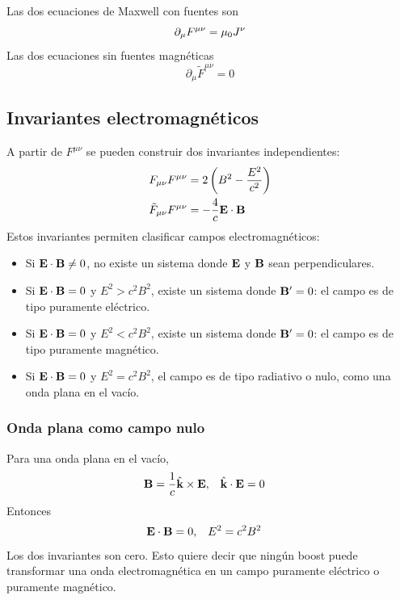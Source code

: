 \documentclass[]{article}
\numberwithin{equation}{section}
\begin{document}
Las dos ecuaciones de Maxwell con fuentes son
\begin{equation}
	\partial_\mu F^{\mu\nu} = \mu_{0} J^\nu
\end{equation}
Las dos ecuaciones sin fuentes magnéticas 
\begin{equation}
	\partial_\mu \tilde{F}^{\mu\nu} = 0
\end{equation}

\subsection{Invariantes electromagnéticos}
A partir de $F^{\mu\nu}$ se pueden construir dos invariantes independientes:
\begin{align}
	F_{\mu\nu} F^{\mu\nu} &= 2 \left(B^2 - \frac{E^2}{c^2}\right)\\
	\tilde{F}_{\mu\nu} F^{\mu\nu} &= -\frac{4}{c} \mathbf{E}\cdot\mathbf{B}
\end{align}
Estos invariantes permiten clasificar campos electromagnéticos:
\begin{itemize}
	\item Si $\mathbf{E} \cdot \mathbf{B} \neq 0$, no existe un sistema donde $\mathbf{E}$ y $\mathbf{B}$ sean perpendiculares.
	\item Si $\mathbf{E} \cdot \mathbf{B} = 0$ y $E^2 > c^2 B^2$, existe un sistema donde $\mathbf{B}' = 0$: el campo es de tipo puramente eléctrico.
	\item Si $\mathbf{E} \cdot \mathbf{B} = 0$ y $E^2 < c^2 B^2$, existe un sistema donde $\mathbf{B}' = 0$: el campo es de tipo puramente magnético.
	\item Si $\mathbf{E} \cdot \mathbf{B} = 0$ y $E^2 = c^2 B^2$, el campo es de tipo radiativo o nulo, como una onda plana en el vacío.
\end{itemize}

\subsubsection{Onda plana como campo nulo}
Para una onda plana en el vacío,
\begin{align*}
	\mathbf{B} &= \frac{1}{c} \hat{\mathbf{k}}\times\mathbf{E}, & \hat{\mathbf{k}}\cdot\mathbf{E} &= 0
\end{align*}
Entonces
\begin{align}
	\mathbf{E} \cdot \mathbf{B} &= 0, & E^2 &= c^2 B^2
\end{align}
Los dos invariantes son cero. Esto quiere decir que ningún boost puede transformar una onda electromagnética en un campo puramente eléctrico o puramente magnético.
\end{document}
